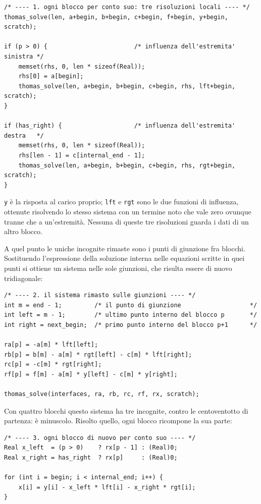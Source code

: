 \documentclass[11pt,a4paper]{article}
\newcommand{\cd}[1]{\texttt{\small #1}}
\begin{document}
\begin{lstlisting}
/* ---- 1. ogni blocco per conto suo: tre risoluzioni locali ---- */
thomas_solve(len, a+begin, b+begin, c+begin, f+begin, y+begin, scratch);

if (p > 0) {                        /* influenza dell'estremita' sinistra */
    memset(rhs, 0, len * sizeof(Real));
    rhs[0] = a[begin];
    thomas_solve(len, a+begin, b+begin, c+begin, rhs, lft+begin, scratch);
}

if (has_right) {                    /* influenza dell'estremita' destra   */
    memset(rhs, 0, len * sizeof(Real));
    rhs[len - 1] = c[internal_end - 1];
    thomas_solve(len, a+begin, b+begin, c+begin, rhs, rgt+begin, scratch);
}
\end{lstlisting}

\cd{y} è la risposta al carico proprio; \cd{lft} e \cd{rgt} sono le due funzioni
di influenza, ottenute risolvendo lo stesso sistema con un termine noto che vale
zero ovunque tranne che a un'estremità. Nessuna di queste tre risoluzioni guarda
i dati di un altro blocco.

\medskip
A quel punto le uniche incognite rimaste sono i punti di giunzione fra blocchi.
Sostituendo l'espressione della soluzione interna nelle equazioni scritte in
quei punti si ottiene un sistema nelle sole giunzioni, che risulta essere di
nuovo tridiagonale:

\begin{lstlisting}
/* ---- 2. il sistema rimasto sulle giunzioni ---- */
int m = end - 1;         /* il punto di giunzione                   */
int left = m - 1;        /* ultimo punto interno del blocco p       */
int right = next_begin;  /* primo punto interno del blocco p+1      */

ra[p] = -a[m] * lft[left];
rb[p] = b[m] - a[m] * rgt[left] - c[m] * lft[right];
rc[p] = -c[m] * rgt[right];
rf[p] = f[m] - a[m] * y[left] - c[m] * y[right];

thomas_solve(interfaces, ra, rb, rc, rf, rx, scratch);
\end{lstlisting}

Con quattro blocchi questo sistema ha tre incognite, contro le centoventotto di
partenza: è minuscolo. Risolto quello, ogni blocco ricompone la sua parte:

\begin{lstlisting}
/* ---- 3. ogni blocco di nuovo per conto suo ---- */
Real x_left  = (p > 0)    ? rx[p - 1] : (Real)0;
Real x_right = has_right  ? rx[p]     : (Real)0;

for (int i = begin; i < internal_end; i++) {
    x[i] = y[i] - x_left * lft[i] - x_right * rgt[i];
}
\end{lstlisting}
\end{document}
